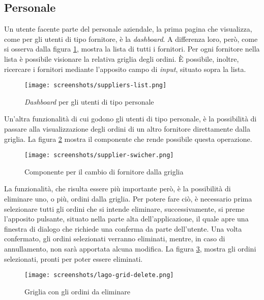 \subsection{Personale}
Un utente facente parte del personale aziendale, la prima pagina che visualizza, come per gli utenti di tipo fornitore, è la \emph{dashboard}.
A differenza loro, però, come si osserva dalla figura \ref{fig:lago-dashboard}, mostra la lista di tutti i fornitori.
Per ogni fornitore nella lista è possibile visionare la relativa griglia degli ordini.
È possibile, inoltre, ricercare i fornitori mediante l'apposito campo di \emph{input}, situato sopra la lista.

\begin{figure}[!ht]
  \begin{center}
    \texttt{[image: screenshots/suppliers-list.png]}
    \caption{\emph{Dashboard} per gli utenti di tipo personale}
    \label{fig:lago-dashboard}
  \end{center}
\end{figure}

Un'altra funzionalità di cui godono gli utenti di tipo personale, è la possibilità di passare alla visualizzazione degli ordini di un altro fornitore direttamente dalla griglia.
La figura \ref{fig:supplier-swicher} mostra il componente che rende possibile questa operazione.

\begin{figure}[!ht]
  \begin{center}
    \texttt{[image: screenshots/supplier-swicher.png]}
    \caption{Componente per il cambio di fornitore dalla griglia}
    \label{fig:supplier-swicher}
  \end{center}
\end{figure}

La funzionalità, che risulta essere più importante però, è la possibilità di eliminare uno, o più, ordini dalla griglia.
Per potere fare ciò, è necessario prima selezionare tutti gli ordini che si intende eliminare, successivamente, si preme l'apposito pulsante, situato nella parte alta dell'applicazione, il quale apre una finestra di dialogo che richiede una conferma da parte dell'utente.
Una volta confermato, gli ordini selezionati verranno eliminati, mentre, in caso di annullamento, non sarà apportata alcuna modifica.
La figura \ref{fig:lago-grid-delete}, mostra gli ordini selezionati, pronti per poter essere eliminati.

\begin{figure}[!ht]
  \begin{center}
    \texttt{[image: screenshots/lago-grid-delete.png]}
    \caption{Griglia con gli ordini da eliminare}
    \label{fig:lago-grid-delete}
  \end{center}
\end{figure}

